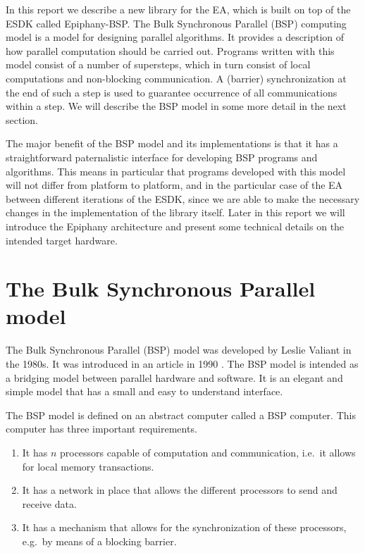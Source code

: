 \documentclass[fleqn]{article}
\renewcommand{\(}{\left(}
\renewcommand{\)}{\right)}
\begin{document}
In this report we describe a new library for the EA, which is built on top of the ESDK called Epiphany-BSP. The Bulk Synchronous Parallel (BSP) computing model is a model for designing parallel algorithms. It provides a description of how parallel computation should be carried out. Programs written with this model consist of a number of supersteps, which in turn consist of local computations and non-blocking communication. A (barrier) synchronization at the end of such a step is used to guarantee occurrence of all communications within a step. We will describe the BSP model in some more detail in the next section. 

The major benefit of the BSP model and its implementations is that it has a straightforward paternalistic interface for developing BSP programs and algorithms. This means in particular that programs developed with this model will not differ from platform to platform, and in the particular case of the EA between different iterations of the ESDK, since we are able to make the necessary changes in the implementation of the library itself. Later in this report we will introduce the Epiphany architecture and present some technical details on the intended target hardware.

\section{The Bulk Synchronous Parallel model}

The Bulk Synchronous Parallel (BSP) model was developed by Leslie Valiant in the 1980s. It was introduced in an article in 1990 \cite{bsp:valiant}. The BSP model is intended as a bridging model between parallel hardware and software. It is an elegant and simple model that has a small and easy to understand interface.

The BSP model is defined on an abstract computer called a BSP computer. This computer has three important requirements.
\begin{enumerate}[1.]
\item It has $n$ processors capable of computation and communication, i.e.\ it allows for local memory transactions.
\item It has a network in place that allows the different processors to send and receive data.
\item It has a mechanism that allows for the synchronization of these processors, e.g.\ by means of a blocking barrier.
\end{enumerate}
\end{document}
